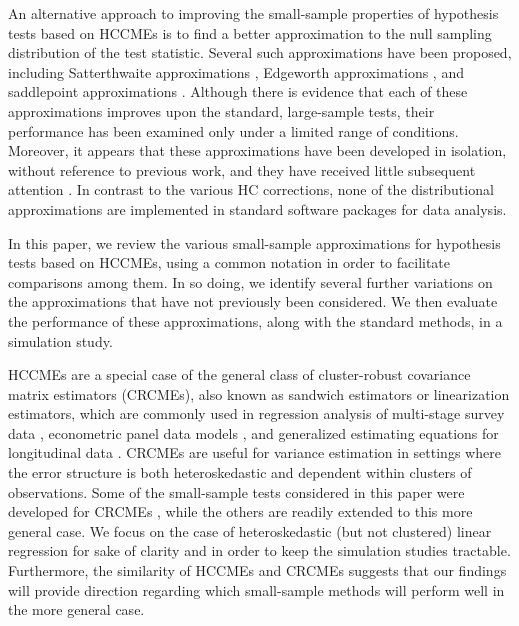 \documentclass[12pt]{article}\usepackage[]{graphicx}\usepackage[]{color}
\begin{document}
An alternative approach to improving the small-sample properties of hypothesis tests based on HCCMEs is to find a better approximation to the null sampling distribution of the test statistic. 
Several such approximations have been proposed, including Satterthwaite approximations \citep{Lipsitz1999degrees}, Edgeworth approximations \citep{Rothenberg1988approximate, Kauermann2001note}, and saddlepoint approximations \citep{McCaffrey2006improved}. 
Although there is evidence that each of these approximations improves upon the standard, large-sample tests, their performance has been examined only under a limited range of conditions. 
Moreover, it appears that these approximations have been developed in isolation, without reference to previous work, and they have received little subsequent attention \citep[e.g., none are discussed in a recent review by][]{MacKinnon2013thirty}. 
In contrast to the various HC corrections, none of the distributional approximations are implemented in standard software packages for data analysis. 

In this paper, we review the various small-sample approximations for hypothesis tests based on HCCMEs, using a common notation in order to facilitate comparisons among them. 
In so doing, we identify several further variations on the approximations that have not previously been considered. 
We then evaluate the performance of these approximations, along with the standard methods, in a simulation study. 

HCCMEs are a special case of the general class of cluster-robust covariance matrix estimators (CRCMEs), also known as sandwich estimators or linearization estimators, which are commonly used in regression analysis of multi-stage survey data \citep{Fuller1975regression, Skinner1989domain}, econometric panel data models \citep{white1984asymptotic, Arellano1987computing}, and generalized estimating equations for longitudinal data \citep{Liang1986longitudinal}. 
CRCMEs are useful for variance estimation in settings where the error structure is both heteroskedastic and dependent within clusters of observations.
Some of the small-sample tests considered in this paper were developed for CRCMEs \citep[i.e.,][]{Bell2002bias, McCaffrey2006improved}, while the others are readily extended to this more general case.
We focus on the case of heteroskedastic (but not clustered) linear regression for sake of clarity and in order to keep the simulation studies tractable. 
Furthermore, the similarity of HCCMEs and CRCMEs suggests that our findings will provide direction regarding which small-sample methods will perform well in the more general case.
\end{document}
